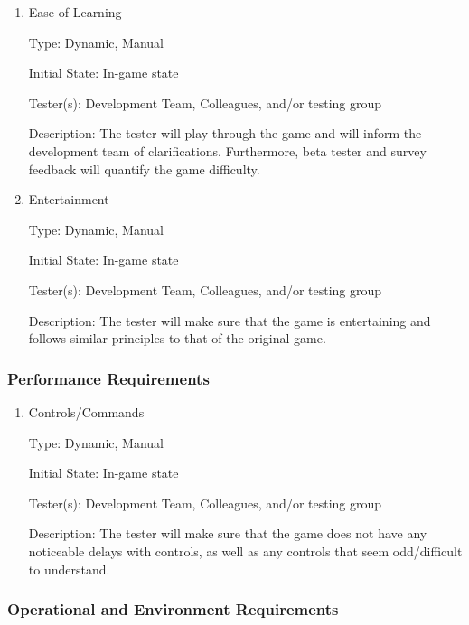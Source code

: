 \documentclass[12pt, titlepage]{article}
\begin{document}
\begin{enumerate}

\item{Ease of Learning\\}

Type: Dynamic, Manual

Initial State: In-game state

Tester(s): Development Team, Colleagues, and/or testing group

Description: The tester will play through the game and will inform the development team of clarifications. Furthermore, beta tester and survey feedback will quantify the game difficulty.

\item{Entertainment\\}

Type: Dynamic, Manual

Initial State: In-game state

Tester(s): Development Team, Colleagues, and/or testing group

Description: The tester will make sure that the game is entertaining and follows similar principles to that of the original game.

\end{enumerate}

\subsubsection{Performance Requirements}

\begin{enumerate}

\item{Controls/Commands\\}

Type: Dynamic, Manual

Initial State: In-game state

Tester(s): Development Team, Colleagues, and/or testing group

Description: The tester will make sure that the game does not have any noticeable delays with controls, as well as any controls that seem odd/difficult to understand.

\end{enumerate}

\subsubsection{Operational and Environment Requirements}
\end{document}
